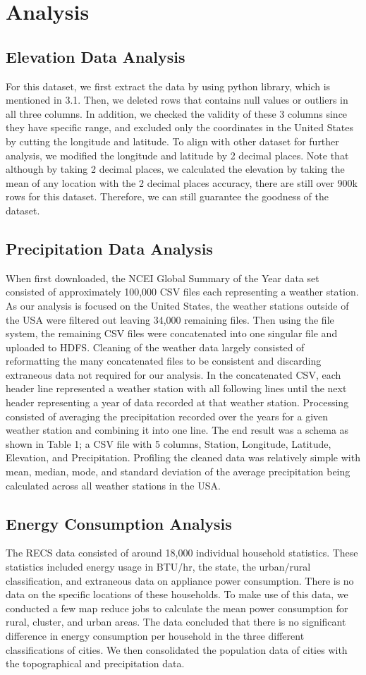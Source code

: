 \documentclass[11pt]{article}
\begin{document}
\section{Analysis}
\subsection{Elevation Data Analysis}
For this dataset, we first extract the data by using python library, which is mentioned in 3.1. Then, we deleted rows that contains null values or outliers in all three columns. In addition, we checked the validity of these 3 columns since they have specific range, and excluded only the coordinates in the United States by cutting the longitude and latitude. To align with other dataset for further analysis, we modified the longitude and latitude by 2 decimal places. Note that although by taking 2 decimal places, we calculated the elevation by taking the mean of any location with the 2 decimal places accuracy, there are still over 900k rows for this dataset. Therefore, we can still guarantee the goodness of the dataset.
\subsection{Precipitation Data Analysis}
When first downloaded, the NCEI Global Summary of the Year data set consisted of approximately 100,000 CSV files each representing a weather station. As our analysis is focused on the United States, the weather stations outside of the USA were filtered out leaving 34,000 remaining files. Then using the file system, the remaining CSV files were concatenated into one singular file and uploaded to HDFS. Cleaning of the weather data largely consisted of reformatting the many concatenated files to be consistent and discarding extraneous data not required for our analysis. In the concatenated CSV, each header line represented a weather station with all following lines until the next header representing a year of data recorded at that weather station. Processing consisted of averaging the precipitation recorded over the years for a given weather station and combining it into one line. The end result was a schema as shown in Table 1; a CSV file with 5 columns, Station, Longitude, Latitude, Elevation, and Precipitation. Profiling the cleaned data was relatively simple with mean, median, mode, and standard deviation of the average precipitation being calculated across all weather stations in the USA.
\subsection{Energy Consumption Analysis}
The RECS data consisted of around 18,000 individual household statistics. These statistics included energy usage in BTU/hr, the state, the urban/rural classification, and extraneous data on appliance power consumption. There is no data on the specific locations of these households. To make use of this data, we conducted a few map reduce jobs to calculate the mean power consumption for rural, cluster, and urban areas. The data concluded that there is no significant difference in energy consumption per household in the three different classifications of cities. We then consolidated the population data of cities with the topographical and precipitation data. 
\end{document}

